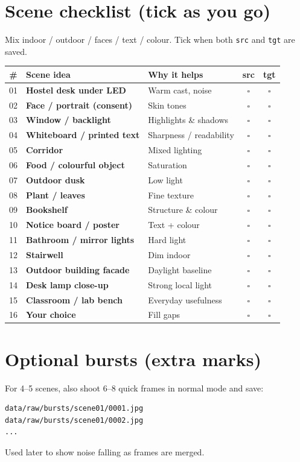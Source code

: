 \documentclass[11pt,a4paper]{article}
\begin{document}
\section{Scene checklist (tick as you go)}
Mix indoor / outdoor / faces / text / colour. Tick when both \texttt{src} and \texttt{tgt} are saved.

\vspace{0.3em}
\renewcommand{\arraystretch}{1.35}
\begin{tabularx}{\textwidth}{@{}c >{\bfseries}l X c c@{}}
\toprule
\# & Scene idea & Why it helps & src & tgt \\
\midrule
01 & Hostel desk under LED & Warm cast, noise & $\square$ & $\square$ \\
02 & Face / portrait (consent) & Skin tones & $\square$ & $\square$ \\
03 & Window / backlight & Highlights \& shadows & $\square$ & $\square$ \\
04 & Whiteboard / printed text & Sharpness / readability & $\square$ & $\square$ \\
05 & Corridor & Mixed lighting & $\square$ & $\square$ \\
06 & Food / colourful object & Saturation & $\square$ & $\square$ \\
07 & Outdoor dusk & Low light & $\square$ & $\square$ \\
08 & Plant / leaves & Fine texture & $\square$ & $\square$ \\
09 & Bookshelf & Structure \& colour & $\square$ & $\square$ \\
10 & Notice board / poster & Text + colour & $\square$ & $\square$ \\
11 & Bathroom / mirror lights & Hard light & $\square$ & $\square$ \\
12 & Stairwell & Dim indoor & $\square$ & $\square$ \\
13 & Outdoor building facade & Daylight baseline & $\square$ & $\square$ \\
14 & Desk lamp close-up & Strong local light & $\square$ & $\square$ \\
15 & Classroom / lab bench & Everyday usefulness & $\square$ & $\square$ \\
16 & Your choice & Fill gaps & $\square$ & $\square$ \\
\bottomrule
\end{tabularx}

\section{Optional bursts (extra marks)}
For 4--5 scenes, also shoot 6--8 quick frames in normal mode and save:
\begin{verbatim}
data/raw/bursts/scene01/0001.jpg
data/raw/bursts/scene01/0002.jpg
...
\end{verbatim}
Used later to show noise falling as frames are merged.
\end{document}
